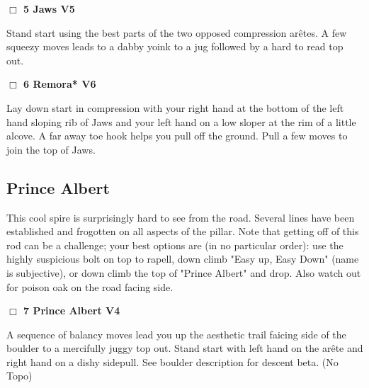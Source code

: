 \begin{multicols}{2}
\needspace{2em}
\label{rt:Jaws}
\colorbox{RoyalBlue!20}{
\parbox{0.95\linewidth}{
\hspace{-1ex}\textbf{$\Box$
5 Jaws V5  
}}}
\begin{adjustwidth}{1.3em}{}			

Stand start using the best parts of the two opposed compression arêtes. A few squeezy moves leads to a dabby yoink to a jug followed by a hard to read top out.
\end{adjustwidth}




\needspace{2em}
\label{rt:Remora}
\colorbox{RoyalBlue!20}{
\parbox{0.95\linewidth}{
\hspace{-1ex}\textbf{$\Box$
6 Remora* V6  
}}}
\begin{adjustwidth}{1.3em}{}			

Lay down start in compression with your right hand at the bottom of the left hand sloping rib of Jaws and your left hand on a low sloper at the rim of a little alcove. A far away toe hook helps you pull off the ground. Pull a few moves to join the top of Jaws.
\end{adjustwidth}





\needspace{10em}
\subsection*{Prince Albert}\label{bf:Prince Albert}

This cool spire is surprisingly hard to see from the road. Several lines have been established and frogotten on all aspects of the pillar. Note that getting off of this rod can be a challenge; your best options are (in no particular order): use the highly suspicious bolt on top to rapell, down climb "Easy up, Easy Down" (name is subjective), or down climb the top of "Prince Albert" and drop. Also watch out for poison oak on the road facing side.\\



\needspace{2em}
\label{rt:Prince Albert}
\colorbox{RoyalBlue!20}{
\parbox{0.95\linewidth}{
\hspace{-1ex}\textbf{$\Box$
7 Prince Albert V4  \warn
}}}
\begin{adjustwidth}{1.3em}{}			

A sequence of balancy moves lead you up the aesthetic trail faicing side of the boulder to a mercifully juggy top out. Stand start with left hand on the arête and right hand on a dishy sidepull. See boulder description for descent beta.
  (No Topo)
\end{adjustwidth}





\end{multicols}
